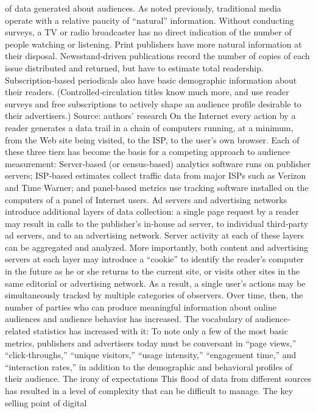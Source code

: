 of data generated about audiences. As noted previously, traditional media
operate with a relative paucity of ``natural'' information. Without
conducting surveys, a TV or radio broadcaster has no direct indication of
the number of people watching or listening.
Print publishers have more natural information at their disposal.
Newsstand‐driven publications record the number of copies of each issue
distributed and returned, but have to estimate total readership.
Subscription‐based periodicals also have basic demographic information
about their readers. (Controlled‐circulation titles know much more, and
use reader surveys and free subscriptions to actively shape an audience
profile desirable to their advertisers.)
Source: authors’ research
On the Internet every action by a reader generates a data trail in a chain of
computers running, at a minimum, from the Web site being visited, to the
ISP, to the user’s own browser. Each of these three tiers has become the
basis for a competing approach to audience measurement: Server‐based
(or census‐based) analytics software runs on publisher servers; ISP‐based
estimates collect traffic data from major ISPs such as Verizon and Time
Warner; and panel‐based metrics use tracking software installed on the
computers of a panel of Internet users.
Ad servers and advertising networks introduce additional layers of data
collection: a single page request by a reader may result in calls to the
publisher’s in‐house ad server, to individual third‐party ad servers, and to
an advertising network. Server activity at each of these layers can be
aggregated and analyzed. More importantly, both content and advertising
servers at each layer may introduce a ``cookie'' to identify the reader’s
computer in the future as he or she returns to the current site, or visits
other sites in the same editorial or advertising network. As a result, a
single user’s actions may be simultaneously tracked by multiple categories
of observers.
Over time, then, the number of parties who can produce meaningful
information about online audiences and audience behavior has increased.
The vocabulary of audience‐related statistics has increased with it: To note
only a few of the most basic metrics, publishers and advertisers today
must be conversant in ``page views,'' ``click‐throughs,'' ``unique visitors,''
``usage intensity,'' ``engagement time,'' and ``interaction rates,'' in addition
to the demographic and behavioral profiles of their audience.
The irony of expectations
This flood of data from different sources has resulted in a level of
complexity that can be difficult to manage. The key selling point of digital
